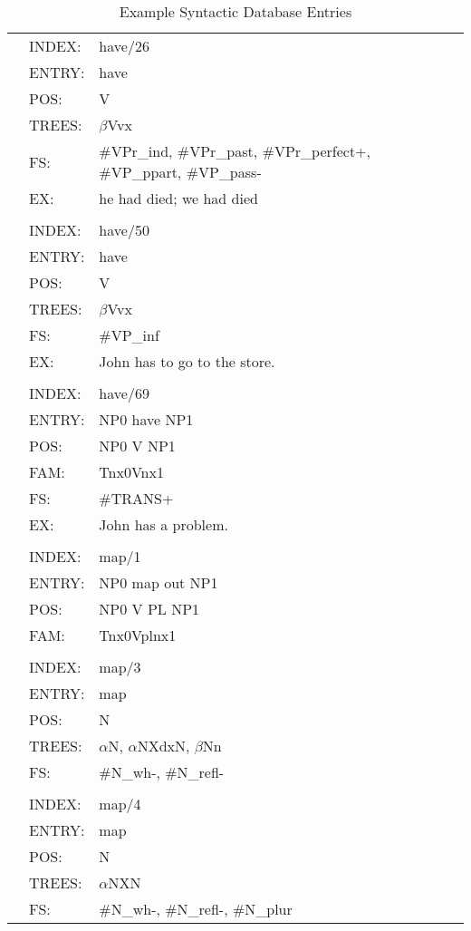 {\begin{table}[htb]
\begin{tabular}{lll}

\hspace{0.5in}&INDEX: & have/26 \\
&ENTRY: & have \\
&POS: & V \\
&TREES:& $\beta$Vvx \\
&FS:&\#VPr\_ind, \#VPr\_past, \#VPr\_perfect+, \#VP\_ppart, \#VP\_pass- \\
&EX:&he had died; we had died \\
\\
&INDEX: & have/50 \\
&ENTRY:& have \\ 
&POS:& V \\ 
&TREES:& $\beta$Vvx \\
&FS:&\#VP\_inf  \\ 
&EX:&John has to go to the store. \\
\\
&INDEX:&have/69\\
&ENTRY:&NP0 have NP1\\
&POS:&NP0 V NP1 \\
&FAM: &Tnx0Vnx1 \\
&FS:&\#TRANS+ \\
&EX:&John has a problem. \\
\\
&INDEX:&map/1 \\
&ENTRY:&NP0 map out NP1 \\
&POS:&NP0 V PL NP1 \\
&FAM: &Tnx0Vplnx1 \\
\\
&INDEX:& map/3 \\
&ENTRY:& map \\
&POS: & N \\
&TREES: & $\alpha$N,  $\alpha$NXdxN, $\beta$Nn \\
&FS: & \#N\_wh-, \#N\_refl- \\
\\
&INDEX: & map/4 \\
&ENTRY: & map \\
&POS: & N \\
&TREES: & $\alpha$NXN \\
&FS: & \#N\_wh-, \#N\_refl-, \#N\_plur \\
\end{tabular}	
\caption{Example Syntactic Database Entries}
\label{syn-entries}
\end{table}

}
